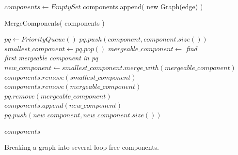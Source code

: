 \documentclass[11pt]{article}
\begin{document}
\begin{figure}
\begin{algorithmic}[1] 
  	\State $components \gets EmptySet$
  		\State components.append( new Graph(edge) )
  	\EndFor
  	
  	\State \Return MergeComponents( components )
  \EndFunction
\end{algorithmic}


\begin{algorithmic}[1]   
  	\State $pq \gets PriorityQueue()$
        \State $pq.push(component, component.size())$
    \EndFor
    	\State $smallest\_component \gets pq.pop()$
    	\State $mergeable\_component \gets$ \emph{find first mergeable component in pq}
		\State $new\_component \gets smallest\_component.merge\_with( mergeable\_component )$
    	\State $components.remove( smallest\_component )$
    	\State $components.remove( mergeable\_component )$
    	\State $pq.remove( mergeable\_component )$
    	\State $components.append( new\_component )$
    	\State $pq.push(new\_component, new\_component.size())$
	\EndWhile
	
    \State \Return $components$
  \EndFunction  
\end{algorithmic}
	\caption{\label{breakgraph}} Breaking a graph into several loop-free components.
\end{figure}
\end{document}
